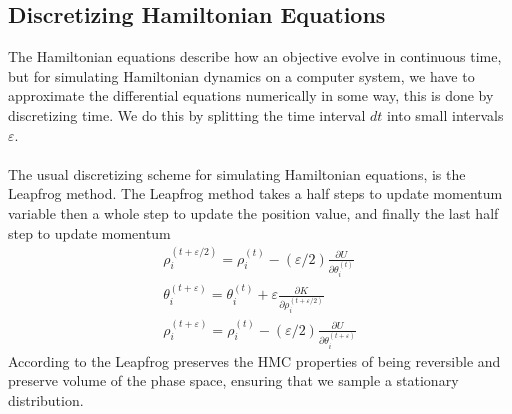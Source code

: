 \subsection{Discretizing Hamiltonian Equations}
The Hamiltonian equations describe how an objective evolve in continuous time, but for simulating Hamiltonian dynamics on a computer system, we have to approximate the differential equations numerically in some way, this is done by discretizing time. We do this by splitting the time interval $dt$ into small intervals $\varepsilon$. 
\\
\\
The usual discretizing scheme for simulating Hamiltonian equations, is the Leapfrog method. The Leapfrog method takes a half steps to update momentum variable then a whole step to update the position value, and finally the last half step to update momentum
\begin{equation*}
\begin{split}
\rho_{i}^{(t+\varepsilon / 2)}=\rho_{i}^{(t)}-(\varepsilon / 2) \frac{\partial U}{\partial \theta_{i}^{(t)}} \\
\theta_{i}^{(t+\varepsilon)}=\theta_{i}^{(t)}+\varepsilon \frac{\partial K}{\partial \rho_{i}^{(t+\varepsilon / 2)}} \\
\rho_{i}^{(t+\varepsilon)}=\rho_{i}^{(t)}-(\varepsilon / 2) \frac{\partial U}{\partial \theta_{i}^{(t+\varepsilon)}}
\end{split}
\end{equation*}
According to \cite{neal2012mcmc} the Leapfrog preserves the HMC properties of being reversible and preserve volume of the phase space, ensuring that we sample a stationary distribution.


